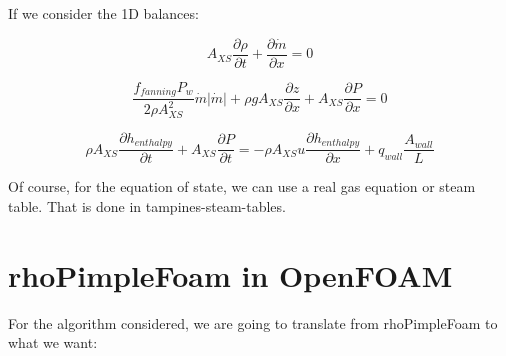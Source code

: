 \documentclass[masters]{ucbthesis}
\renewcommand{\_}{\kern-1.5pt\textunderscore\kern-1.5pt}
\begin{document}
If we consider the 1D balances:

\begin{equation*} 
	A_{XS} \frac{\partial \rho}{\partial t} + \frac{\partial \dot{m}}{\partial x} = 0
\end{equation*}

\begin{equation*} 
	\frac{f_{fanning} P_w}{2 \rho A_{XS}^2} \dot{m} |\dot{m}|
	+ \rho g A_{XS} \frac{\partial z}{\partial x}
	+ A_{XS} \frac{\partial P}{\partial x} = 0
\end{equation*}

\begin{equation*} 
	\rho A_{XS} \frac{\partial h_{enthalpy}}{\partial t} 
	+ A_{XS} \frac{\partial P}{\partial t} = 
	- \rho A_{XS} u \frac{\partial h_{enthalpy}}{\partial x}
	+ q_{wall} \frac{A_{wall}}{L}
\end{equation*}

Of course, for the equation of state, we can use a real gas equation 
or steam table. That is done in tampines-steam-tables.

\chapter{rhoPimpleFoam in OpenFOAM}

For the algorithm considered, we are going to translate from
rhoPimpleFoam to what we want:
\end{document}

